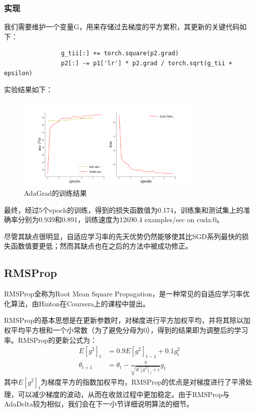 \documentclass[10.5pt,a4paper]{article}%
\begin{document}
            \subsubsection{实现}
            我们需要维护一个变量G，用来存储过去梯度的平方累积，其更新的关键代码如下：
            \begin{lstlisting}
                g_tii[:] += torch.square(p2.grad)
                p2[:] -= p1['lr'] * p2.grad / torch.sqrt(g_tii + epsilon)
            \end{lstlisting}\par
            实验结果如下：
            \begin{figure}[H]
            \centering
                \includegraphics[width=0.8\textwidth]{imgs_5e/AdaGrad.png}
              \caption{AdaGrad的训练结果}
              \label{fig:adagrad}
            \end{figure} 
            最终，经过5个epoch的训练，得到的损失函数值为0.174，训练集和测试集上的准确率分别为0.939和0.891，训练速度为12690.4 examples/sec on cuda:0。\par
            尽管其缺点很明显，自适应学习率的先天优势仍然能够使其比SGD系列最快的损失函数值要更低；然而其缺点也在之后的方法中被成功修正。
        \subsection{RMSProp}
            RMSProp全称为Root Mean Square Propagation，是一种常见的自适应学习率优化算法，由Hinton在Coursera上的课程中提出。\par
            RMSProp的基本思想是在更新参数时，对梯度进行平方加权平均，并将其除以加权平均平方根和一个小常数（为了避免分母为0），得到的结果即为调整后的学习率。RMSProp的更新公式为：
            \begin{align*}E[g^2]_t&=0.9E[g^2]_{t-1}+0.1g^2_t\\ \theta_{t+1}&=\theta_t-\frac{\eta}{\sqrt{E[g^2]_t+\epsilon}}g_t
            \end{align*}
		其中$E[g^2]_t$为梯度平方的指数加权平均，RMSProp的优点是对梯度进行了平滑处理，可以减少梯度的波动，从而在收敛过程中更加稳定。由于RMSProp与AdaDelta较为相似，我们会在下一小节详细说明算法的细节。
\end{document}

